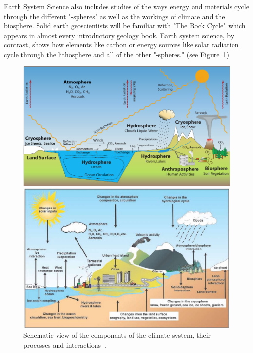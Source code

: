 Earth System Science also includes studies of the ways energy and materials cycle through the different "-spheres" 
as well as the workings of climate and the biosphere. Solid earth geoscientists will be familiar with "The Rock Cycle" 
which appears in almost every introductory geology book. Earth system science, by contrast, shows how elements like 
carbon or energy sources like solar radiation cycle through the lithosphere and all of the other "-spheres."  (see Figure~\ref{fig:schema})
\begin{figure}[!hp]
    \begin{minipage}[c]{0.54\linewidth}
        \centering
        \includegraphics[scale=0.6]{pic/cycle}
    \end{minipage}
    \begin{minipage}[c]{0.45\linewidth}
        \centering
        \includegraphics[scale=0.6]{pic/tmp6441}
    \end{minipage}  
    \caption{Schematic view of the components of the climate system, their processes and interactions~\cite{Stocker2011,ipcc}.}
    \label{fig:schema}
\end{figure}


